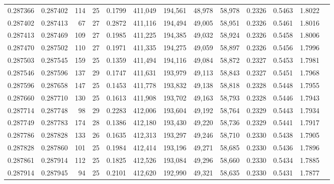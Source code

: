 \begin{tabular}{rrrrrrrrrrrrr}
0.287366 & 0.287402 &   114 &  25 &                                     0.1799 & 411,049 & 194,561 &  48,978 &  58,978 & 0.2326 & 0.5463 & 1.8022 \\
0.287402 & 0.287413 &    67 &  27 &                                     0.2872 & 411,116 & 194,494 &  49,005 &  58,951 & 0.2326 & 0.5461 & 1.8016 \\
0.287413 & 0.287469 &   109 &  27 &                                     0.1985 & 411,225 & 194,385 &  49,032 &  58,924 & 0.2326 & 0.5458 & 1.8006 \\
0.287470 & 0.287502 &   110 &  27 &                                     0.1971 & 411,335 & 194,275 &  49,059 &  58,897 & 0.2326 & 0.5456 & 1.7996 \\
0.287503 & 0.287545 &   159 &  25 &                                     0.1359 & 411,494 & 194,116 &  49,084 &  58,872 & 0.2327 & 0.5453 & 1.7981 \\
0.287546 & 0.287596 &   137 &  29 &                                     0.1747 & 411,631 & 193,979 &  49,113 &  58,843 & 0.2327 & 0.5451 & 1.7968 \\
0.287596 & 0.287658 &   147 &  25 &                                     0.1453 & 411,778 & 193,832 &  49,138 &  58,818 & 0.2328 & 0.5448 & 1.7955 \\
0.287660 & 0.287710 &   130 &  25 &                                     0.1613 & 411,908 & 193,702 &  49,163 &  58,793 & 0.2328 & 0.5446 & 1.7943 \\
0.287714 & 0.287748 &    98 &  29 &                                     0.2283 & 412,006 & 193,604 &  49,192 &  58,764 & 0.2329 & 0.5443 & 1.7934 \\
0.287749 & 0.287783 &   174 &  28 &                                     0.1386 & 412,180 & 193,430 &  49,220 &  58,736 & 0.2329 & 0.5441 & 1.7917 \\
0.287786 & 0.287828 &   133 &  26 &                                     0.1635 & 412,313 & 193,297 &  49,246 &  58,710 & 0.2330 & 0.5438 & 1.7905 \\
0.287828 & 0.287860 &   101 &  25 &                                     0.1984 & 412,414 & 193,196 &  49,271 &  58,685 & 0.2330 & 0.5436 & 1.7896 \\
0.287861 & 0.287914 &   112 &  25 &                                     0.1825 & 412,526 & 193,084 &  49,296 &  58,660 & 0.2330 & 0.5434 & 1.7885 \\
0.287914 & 0.287945 &    94 &  25 &                                     0.2101 & 412,620 & 192,990 &  49,321 &  58,635 & 0.2330 & 0.5431 & 1.7877 \\

\end{tabular}
